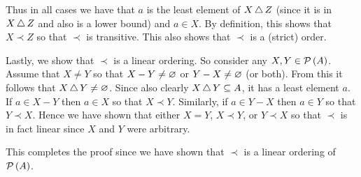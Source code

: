 {{    Thus in all cases we have that $a$ is the least element of $X \,\triangle\, Z$ (since it is in $X \,\triangle\, Z$ and also is a lower bound) and $a \in X$.
    By definition, this shows that $X \prec Z$ so that $\prec$ is transitive.
    This also shows that $\prec$ is a (strict) order.

    Lastly, we show that $\prec$ is a linear ordering.
    So consider any $X, Y \in \mathcal{P}\left(A\right)$.
    Assume that $X \neq Y$ so that $X - Y \neq \varnothing$ or $Y - X \neq \varnothing$ (or both).
    From this it follows that $X \,\triangle\, Y \neq \varnothing$.
    Since also clearly $X \,\triangle\, Y \subseteq A$, it has a least element $a$.
    If $a \in X - Y$ then $a \in X$ so that $X \prec Y$.
    Similarly, if $a \in Y - X$ then $a \in Y$ so that $Y \prec X$.
    Hence we have shown that either $X = Y$, $X \prec Y$, or $Y \prec X$ so that $\prec$ is in fact linear since $X$ and $Y$ were arbitrary.

    This completes the proof since we have shown that $\prec$ is a linear ordering of $\mathcal{P}\left(A\right)$.
  }
}
